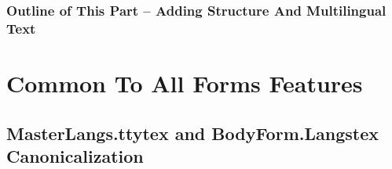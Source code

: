 \begin{latexonly}
\begin{presentationMode}
\begin{frame}[fragile,plain,label=Part0]
\frametitle{Outline of This Part -- Adding Structure And Multilingual Text}
\tableofcontents[sectionstyle=show,subsectionstyle=show]
\end{frame}
\end{presentationMode}
\end{latexonly}


\begin{comment}
*  [[elisp:(org-cycle)][| ]] [[elisp:(org-show-subtree)][|=]] [[elisp:(show-children 10)][|V]] [[elisp:(bx:orgm:indirectBufOther)][|>]] [[elisp:(bx:orgm:indirectBufMain)][|I]] [[elisp:(blee:ppmm:org-mode-toggle)][|N]] [[elisp:(org-top-overview)][|O]] [[elisp:(progn (org-shifttab) (org-content))][|C]] [[elisp:(delete-other-windows)][|1]]  /Section/   Common To All Forms Features ::  [[elisp:(org-cycle)][| ]]
\end{comment}

\section{Common To All Forms Features}


\begin{comment}
**  [[elisp:(org-cycle)][| ]] [[elisp:(org-show-subtree)][|=]] [[elisp:(show-children 10)][|V]] [[elisp:(bx:orgm:indirectBufOther)][|>]] [[elisp:(bx:orgm:indirectBufMain)][|I]] [[elisp:(blee:ppmm:org-mode-toggle)][|N]] [[elisp:(org-top-overview)][|O]] [[elisp:(progn (org-shifttab) (org-content))][|C]] [[elisp:(delete-other-windows)][|1]]  /Subsection/   MasterLangs.ttytex and BodyForm.Langstex Canonicalization ::  [[elisp:(org-cycle)][| ]]
\end{comment}

\subsection{MasterLangs.ttytex and BodyForm.Langstex Canonicalization}


\begin{comment}
*****  [[elisp:(org-cycle)][| ]]  [[elisp:(blee:ppmm:org-mode-toggle)][Nat]] [[elisp:(beginning-of-buffer)][Top]] [[elisp:(delete-other-windows)][(1)]] || /Frame/ *Label=MultilingualizationFeatures*  Multilingualization Features ::  [[elisp:(org-cycle)][| ]]
\end{comment}

